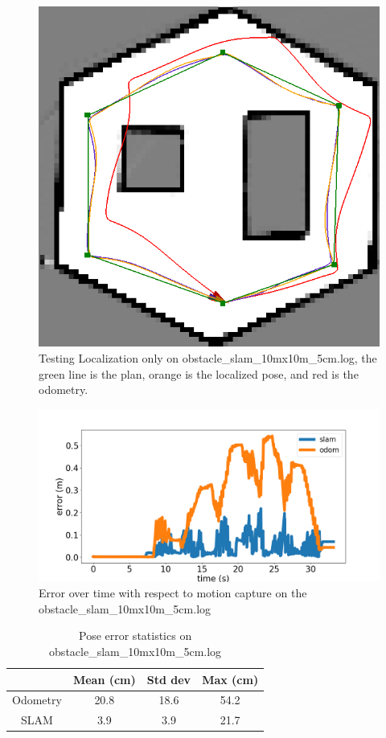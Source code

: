 \documentclass[journal]{IEEEtran}
\begin{document}
            \begin{figure}[h!]
                \centering
                \includegraphics[width=0.65\linewidth]{obstacle_slam_10mx10m_5cm.png}
                \caption{Testing Localization only on obstacle\_slam\_10mx10m\_5cm.log, the green line is the plan, orange is the localized pose, and red is the odometry.}
                \label{fig:localization}
            \end{figure}
            
            \begin{figure}[h!]
                \centering
                \includegraphics[width=1\linewidth]{localization_error.png}
                \caption{Error over time with respect to motion capture on the obstacle\_slam\_10mx10m\_5cm.log}
                \label{fig:localization_error}
            \end{figure}
            
            \begin{table}[h!]
                \centering
                \begin{tabular}{|c|c|c|c|} \hline
                  & Mean (cm) &   Std dev &   Max (cm) \\ \hline
                  Odometry & 20.8  & 18.6  &  54.2 \\ \hline
                  SLAM & 3.9 & 3.9 &  21.7 \\ \hline
                \end{tabular}
            \caption{Pose error statistics on obstacle\_slam\_10mx10m\_5cm.log}
                \label{tab:localization_error}
            \end{table}
            
\end{document}
